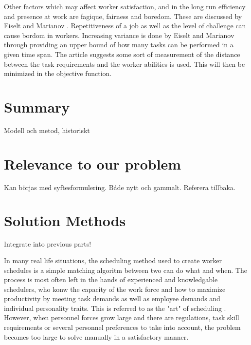 Other factors which may affect worker satisfaction, and in the long run efficiency and presence at work are fagique, fairness and boredom. These are discussed by Eiselt and Marianov \citet{eiselt_2006}. Repetitiveness of a job as well as the level of challenge can cause bordom in workers. Increasing variance is done by Eiselt and Marianov through providing an upper bound of how many tasks can be performed in a given time span. The article suggests some sort of measurement of the distance between the task requirements and the worker abilities is used. This will then be minimized in the objective function.


%
%
%



\section{Summary}
Modell och metod, historiskt

\section{Relevance to our problem}
Kan börjas med syftesformulering. Både nytt och gammalt. Referera tillbaka.


\section{Solution Methods}
Integrate into previous parts!


In many real life situations, the scheduling method used to create worker schedules is a simple matching algoritm between two can do what and when. The process is most often left in the hands of experienced and knowledgable schedulers, who konw the capacity of the work force and how to maximize productivity by meeting task demands as well as employee demands and individual personality traits. This is referred to as the "art" of scheduling \citet{roberts_1983}. However, when personnel forces grow large and there are regulations, task skill requirements or several personnel preferences to take into account, the problem becomes too large to solve manually in a satisfactory manner.

